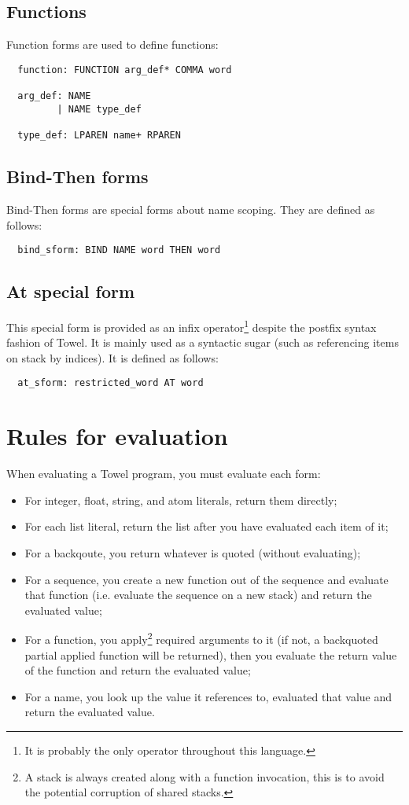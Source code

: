 \documentclass{book}
\begin{document}
\subsection{Functions}

Function forms are used to define functions:
\begin{verbatim}
  function: FUNCTION arg_def* COMMA word

  arg_def: NAME
         | NAME type_def

  type_def: LPAREN name+ RPAREN
\end{verbatim}

\subsection{Bind-Then forms}

Bind-Then forms are special forms about name scoping. They are defined as follows:
\begin{verbatim}
  bind_sform: BIND NAME word THEN word
\end{verbatim}

\subsection{At special form}

This special form is provided as an infix operator\footnote{It is probably the only operator throughout this language.} despite the postfix syntax fashion of Towel. It is mainly used as a syntactic sugar (such as referencing items on stack by indices). It is defined as follows:
\begin{verbatim}
  at_sform: restricted_word AT word
\end{verbatim}

\section{Rules for evaluation}

When evaluating a Towel program, you must evaluate each form:
\begin{itemize}
\item For integer, float, string, and atom literals, return them directly;
\item For each list literal, return the list after you have evaluated each item of it;
\item For a backqoute, you return whatever is quoted (without evaluating);
\item For a sequence, you create a new function out of the sequence and evaluate that function (i.e. evaluate the sequence on a new stack) and return the evaluated value;
\item For a function, you apply\footnote{A stack is always created along with a function invocation, this is to avoid the potential corruption of shared stacks.} required arguments to it (if not, a backquoted partial applied function will be returned), then you evaluate the return value of the function and return the evaluated value;
\item For a name, you look up the value it references to, evaluated that value and return the evaluated value.
\end{itemize}
\end{document}
